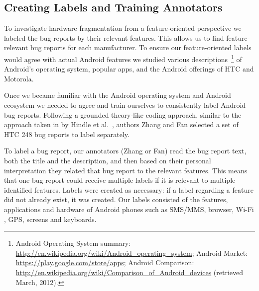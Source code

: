\documentclass[10pt, conference, compsocconf]{IEEEtran}
\begin{document}
\subsection{Creating Labels and Training Annotators}


To investigate hardware fragmentation from a feature-oriented
perspective we labeled the bug reports by their
relevant features. This allows us to find feature-relevant bug reports
for each manufacturer.
To ensure our feature-oriented labels would agree with actual
Android features we studied various descriptions~\footnote{Android Operating System summary:
\url{http://en.wikipedia.org/wiki/Android_operating_system};
Android Market: \url{https://play.google.com/store/apps};
Android Comparison:
\url{http://en.wikipedia.org/wiki/Comparison_of_Android_devices}
(retrieved March, 2012).}
 of Android's
operating system, popular apps, and the Android offerings of HTC and
Motorola.




Once we became familiar with the Android operating system and Android
ecosystem we needed to agree and train ourselves to consistently label
Android bug reports.
Following a grounded theory-like coding approach, similar to the
approach taken in by Hindle et al.~\cite{Hindle2011}, authors Zhang
and Fan selected a set of HTC 248 bug reports to label
separately. 

To label a bug report, our annotators (Zhang or Fan) read the bug
report text, both the title and the description, and  then based on their
personal interpretation they related that bug report to the relevant
features. This means that one bug report could receive multiple labels
if it is relevant to multiple identified features. Labels were created
as necessary: if a label regarding a feature did not already exist, it
was created.
Our labels 
consisted of the features, applications and hardware of Android phones
such as SMS/MMS, browser, Wi-Fi , GPS, screens and
keyboards.
\end{document}
